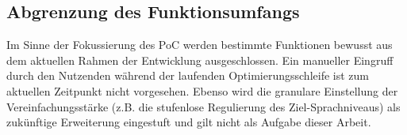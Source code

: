 \subsection{Abgrenzung des Funktionsumfangs}

Im Sinne der Fokussierung des PoC werden bestimmte Funktionen bewusst aus dem aktuellen Rahmen der Entwicklung ausgeschlossen. Ein manueller Eingruff durch den Nutzenden während der laufenden Optimierungsschleife ist zum aktuellen Zeitpunkt nicht vorgesehen. Ebenso wird die granulare Einstellung der Vereinfachungsstärke (z.B. die stufenlose Regulierung des Ziel-Sprachniveaus) als zukünftige Erweiterung eingestuft und gilt nicht als Aufgabe dieser Arbeit.